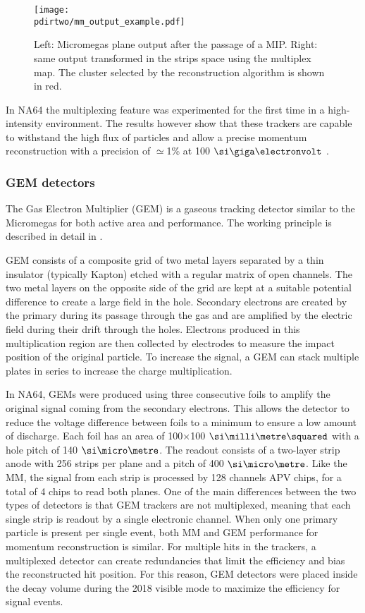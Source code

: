 \begin{figure}[bth!]
  \centering
  \texttt{[image: \\pdirtwo/mm\_output\_example.pdf]}
\caption[Example of the readout of a multiplexing detector]{Left: Micromegas plane output after the passage of a MIP. Right: same output transformed in the strips space using the multiplex map. The cluster selected by the reconstruction algorithm is shown in red.}
\label{fig:multiplexing-example}
\end{figure}

In NA64 the multiplexing feature was experimented for the first time in a high-intensity environment. The results however show that these trackers are capable to withstand the high flux of particles and allow a precise momentum reconstruction with a precision of $\simeq$1\% at 100 $\gev$ \cite{Banerjee:2017mdu}.

\subsubsection{GEM detectors}
\label{ch2:sec:gem}
The Gas Electron Multiplier (GEM) is a gaseous tracking detector similar to the Micromegas for both active area and performance. The working principle is described in detail in \cite{gem,SAULI20162,ABBON2007455}.

GEM consists of a composite grid of two metal layers separated by a thin insulator (typically Kapton) etched with a regular matrix of open channels. The two metal layers on the opposite side of the grid are kept at a suitable potential difference to create a large field in the hole. Secondary electrons are created by the primary during its passage through the gas and are amplified by the electric field during their drift through the holes. Electrons produced in this multiplication region are then collected by electrodes to measure the impact position of the original particle. To increase the signal, a GEM can stack multiple plates in series to increase the charge multiplication.

In NA64, GEMs were produced using three consecutive foils to amplify the original signal coming from the secondary electrons. This allows the detector to reduce the voltage difference between foils to a minimum to ensure a low amount of discharge. Each foil has an area of 100$\times$100 $\mms$ with a hole pitch of 140 $\mum$. The readout consists of a two-layer strip anode with 256 strips per plane and a pitch of 400 $\mum$. Like the MM, the signal from each strip is processed by 128 channels APV chips, for a total of 4 chips to read both planes.
One of the main differences between the two types of detectors is that GEM trackers are not multiplexed, meaning that each single strip is readout by a single electronic channel. When only one primary particle is present per single event, both MM and GEM performance for momentum reconstruction is similar. For multiple hits in the trackers, a multiplexed detector can create redundancies that limit the efficiency and bias the reconstructed hit position. For this reason, GEM detectors were placed inside the decay volume during the 2018 visible mode to maximize the efficiency for signal events.

